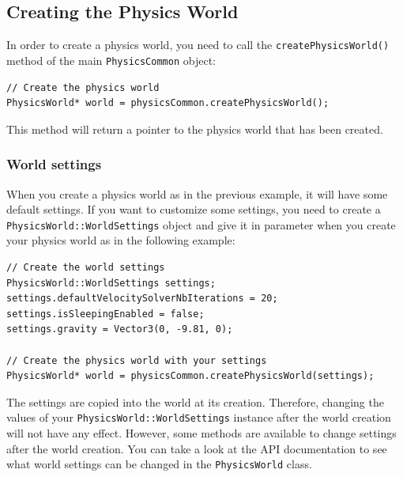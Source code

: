 \documentclass[a4paper,12pt]{article}
\begin{document}
    \subsection{Creating the Physics World}

    In order to create a physics world, you need to call the \texttt{createPhysicsWorld()} method of the main \texttt{PhysicsCommon} object: \\

    \begin{lstlisting}
// Create the physics world
PhysicsWorld* world = physicsCommon.createPhysicsWorld();
    \end{lstlisting}

    \vspace{0.6cm}

    This method will return a pointer to the physics world that has been created.

    \subsubsection{World settings}

    \begin{sloppypar}
    When you create a physics world as in the previous example, it will have some default settings. If you want to customize some settings, you need to
    create a \texttt{PhysicsWorld::WorldSettings} object and give it in parameter when you create your physics world as in the following example: \\
    \end{sloppypar}

    \begin{lstlisting}
// Create the world settings
PhysicsWorld::WorldSettings settings;
settings.defaultVelocitySolverNbIterations = 20;
settings.isSleepingEnabled = false;
settings.gravity = Vector3(0, -9.81, 0);

// Create the physics world with your settings
PhysicsWorld* world = physicsCommon.createPhysicsWorld(settings);
    \end{lstlisting}

    \vspace{0.6cm}

    The settings are copied into the world at its creation. Therefore, changing the values of your \texttt{PhysicsWorld::WorldSettings} instance after the
    world creation will not have any effect. However, some methods are available to change settings after the world creation. You can take a
    look at the API documentation to see what world settings can be changed in the \texttt{PhysicsWorld} class. \\
\end{document}
